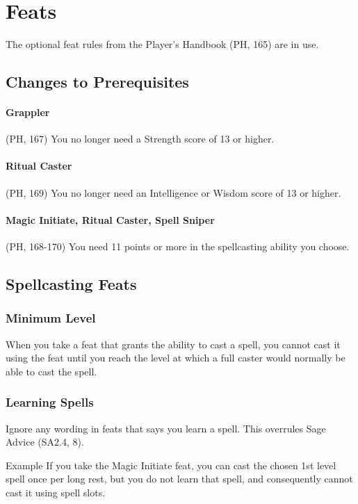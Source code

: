 \documentclass[letterpaper,twocolumn,openany,nodeprecatedcode]{dndbook}
\begin{document}
\section{Feats}
The optional feat rules from the Player's Handbook (PH, 165) are in use.

\subsection{Changes to Prerequisites}

\paragraph{Grappler} (PH, 167) You no longer need a Strength score of 13 or higher.

\paragraph{Ritual Caster} (PH, 169) You no longer need an Intelligence or Wisdom score of 13 or higher.

\paragraph{Magic Initiate, Ritual Caster, Spell Sniper} (PH, 168-170) You need 11 points or more in the spellcasting ability you choose.

\subsection{Spellcasting Feats}

\subsubsection{Minimum Level}
When you take a feat that grants the ability to cast a spell, you cannot cast it using the feat until you reach the level at which a full caster would normally be able to cast the spell.

\subsubsection{Learning Spells}
Ignore any wording in feats that says you learn a spell. This overrules Sage Advice (SA2.4, 8).

\begin{DndComment}{Example}
If you take the Magic Initiate feat, you can cast the chosen 1st level spell once per long rest, but you do not learn that spell, and consequently cannot cast it using spell slots.
\end{DndComment}
\end{document}
